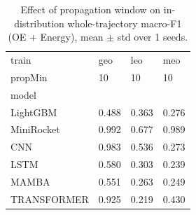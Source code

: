 \begin{table}
\caption{Effect of propagation window on in-distribution whole-trajectory macro-F1 (OE + Energy), mean $\pm$ std over 1 seeds.}
\label{tab:total_window}
\begin{tabular}{llll}
\toprule
train & geo & leo & meo \\
propMin & 10 & 10 & 10 \\
model &  &  &  \\
\midrule
LightGBM & 0.488 & 0.363 & 0.276 \\
MiniRocket & 0.992 & 0.677 & 0.989 \\
CNN & 0.983 & 0.536 & 0.273 \\
LSTM & 0.580 & 0.303 & 0.239 \\
MAMBA & 0.551 & 0.263 & 0.249 \\
TRANSFORMER & 0.925 & 0.219 & 0.430 \\
\bottomrule
\end{tabular}
\end{table}
